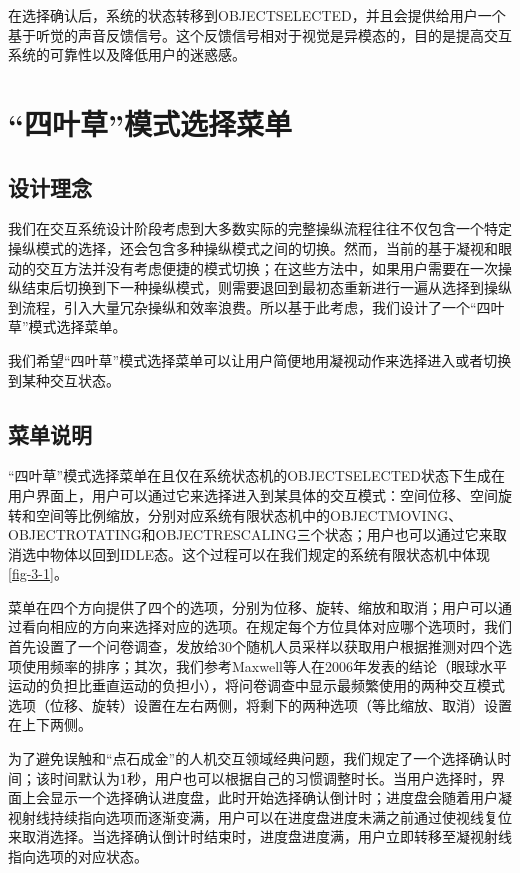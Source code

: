 在选择确认后，系统的状态转移到OBJECT\us SELECTED，并且会提供给用户一个基于听觉的声音反馈信号。这个反馈信号相对于视觉是异模态的，目的是提高交互系统的可靠性以及降低用户的迷惑感。

\section{“四叶草”模式选择菜单}\label{Clover}

\subsection{设计理念}

我们在交互系统设计阶段考虑到大多数实际的完整操纵流程往往不仅包含一个特定操纵模式的选择，还会包含多种操纵模式之间的切换。然而，当前的基于凝视和眼动的交互方法并没有考虑便捷的模式切换；在这些方法中，如果用户需要在一次操纵结束后切换到下一种操纵模式，则需要退回到最初态重新进行一遍从选择到操纵到流程，引入大量冗杂操纵和效率浪费。所以基于此考虑，我们设计了一个“四叶草”模式选择菜单。

我们希望“四叶草”模式选择菜单可以让用户简便地用凝视动作来选择进入或者切换到某种交互状态。

\subsection{菜单说明}

“四叶草”模式选择菜单在且仅在系统状态机的OBJECT\us SELECTED状态下生成在用户界面上，用户可以通过它来选择进入到某具体的交互模式：空间位移、空间旋转和空间等比例缩放，分别对应系统有限状态机中的OBJECT\us MOVING、OBJECT\us ROTATING和OBJECT\us RESCALING三个状态；用户也可以通过它来取消选中物体以回到IDLE态。这个过程可以在我们规定的系统有限状态机中体现\ref{fig-3-1}。

菜单在四个方向提供了四个的选项，分别为位移、旋转、缩放和取消；用户可以通过看向相应的方向来选择对应的选项。在规定每个方位具体对应哪个选项时，我们首先设置了一个问卷调查，发放给30个随机人员采样以获取用户根据推测对四个选项使用频率的排序；其次，我们参考Maxwell等人在2006年发表的结论（眼球水平运动的负担比垂直运动的负担小），将问卷调查中显示最频繁使用的两种交互模式选项（位移、旋转）设置在左右两侧，将剩下的两种选项（等比缩放、取消）设置在上下两侧。

为了避免误触和“点石成金”的人机交互领域经典问题，我们规定了一个选择确认时间；该时间默认为1秒，用户也可以根据自己的习惯调整时长。当用户选择时，界面上会显示一个选择确认进度盘，此时开始选择确认倒计时；进度盘会随着用户凝视射线持续指向选项而逐渐变满，用户可以在进度盘进度未满之前通过使视线复位来取消选择。当选择确认倒计时结束时，进度盘进度满，用户立即转移至凝视射线指向选项的对应状态。


